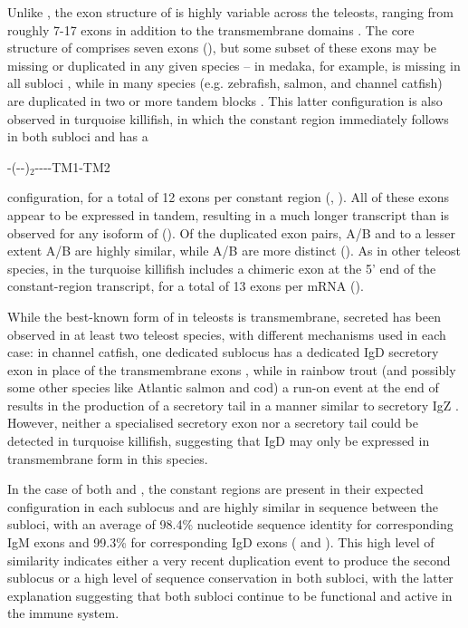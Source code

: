 		Unlike , the exon structure of  is highly variable across the teleosts, ranging from roughly 7-17 \cd{} exons in addition to the transmembrane domains \parencite{fillatreau2013astonishing}. The core structure of  comprises seven \cd{} exons (), but some subset of these exons may be missing or duplicated in any given species -- in medaka, for example,  is missing in all subloci \parencite{magadan2011medaka}, while in many species (e.g. zebrafish, salmon, and channel catfish)  are duplicated in two or more tandem blocks \parencite{fillatreau2013astonishing}. This latter configuration is also observed in turquoise killifish, in which the  constant region immediately follows  in both subloci and has a 

-(--)$_2$----TM1-TM2 

	\noindent configuration, for a total of 12 exons per  constant region (, ). All of these exons appear to be expressed in tandem, resulting in a much longer transcript than is observed for any isoform of  (). Of the duplicated exon pairs, A/B and to a lesser extent A/B are highly similar, while A/B are more distinct (). As in other teleost species,  in the turquoise killifish includes a chimeric  exon at the 5' end of the constant-region transcript, for a total of 13 exons per  mRNA ().

	While the best-known form of  in teleosts is transmembrane, secreted  has been observed in at least two teleost species, with different mechanisms used in each case: in channel catfish, one dedicated sublocus has a dedicated IgD secretory exon in place of the transmembrane exons \parencite{bengten2006catfish}, while in rainbow trout (and possibly some other species like Atlantic salmon and cod) a run-on event at the end of  results in the production of a secretory tail in a manner similar to secretory IgZ \parencite{ramirezgomez2012secretoryigd}. However, neither a specialised secretory exon nor a  secretory tail could be detected in turquoise killifish, suggesting that IgD may only be expressed in transmembrane form in this species.
	
	In the case of both  and , the constant regions are present in their expected configuration in each sublocus and are highly similar in sequence between the subloci, with an average of 98.4\% nucleotide sequence identity for corresponding IgM exons and 99.3\% for corresponding IgD exons ( and ). This high level of similarity indicates either a very recent duplication event to produce the second sublocus or a high level of sequence conservation in both subloci, with the latter explanation suggesting that both subloci continue to be functional and active in the immune system.
	
